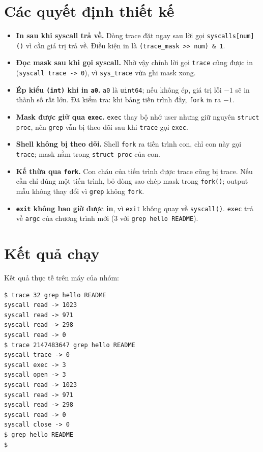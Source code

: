 \documentclass[12pt,a4paper]{article}
\newcommand{\code}[1]{\texttt{#1}}
\begin{document}
\section{Các quyết định thiết kế}
\begin{itemize}
  \item \textbf{In sau khi syscall trả về.} Dòng trace đặt ngay sau lời gọi \code{syscalls[num]()} vì cần giá trị trả về. Điều kiện in là \code{(trace\_mask >> num) \& 1}.
  \item \textbf{Đọc mask sau khi gọi syscall.} Nhờ vậy chính lời gọi \code{trace} cũng được in (\code{syscall trace -> 0}), vì \code{sys\_trace} vừa ghi mask xong.
  \item \textbf{Ép kiểu \code{(int)} khi in \code{a0}.} \code{a0} là \code{uint64}; nếu không ép, giá trị lỗi $-1$ sẽ in thành số rất lớn. Đã kiểm tra: khi bảng tiến trình đầy, \code{fork} in ra $-1$.
  \item \textbf{Mask được giữ qua \code{exec}.} \code{exec} thay bộ nhớ user nhưng giữ nguyên \code{struct proc}, nên \code{grep} vẫn bị theo dõi sau khi \code{trace} gọi \code{exec}.
  \item \textbf{Shell không bị theo dõi.} Shell \code{fork} ra tiến trình con, chỉ con này gọi \code{trace}; mask nằm trong \code{struct proc} của con.
  \item \textbf{Kế thừa qua \code{fork}.} Con cháu của tiến trình được trace cũng bị trace. Nếu cần chỉ đúng một tiến trình, bỏ dòng sao chép mask trong \code{fork()}; output mẫu không thay đổi vì \code{grep} không \code{fork}.
  \item \textbf{\code{exit} không bao giờ được in}, vì \code{exit} không quay về \code{syscall()}. \code{exec} trả về \code{argc} của chương trình mới (3 với \code{grep hello README}).
\end{itemize}

\section{Kết quả chạy}
Kết quả thực tế trên máy của nhóm:
\begin{Verbatim}[fontsize=\small,frame=single]
$ trace 32 grep hello README
syscall read -> 1023
syscall read -> 971
syscall read -> 298
syscall read -> 0
$ trace 2147483647 grep hello README
syscall trace -> 0
syscall exec -> 3
syscall open -> 3
syscall read -> 1023
syscall read -> 971
syscall read -> 298
syscall read -> 0
syscall close -> 0
$ grep hello README
$
\end{Verbatim}
\end{document}
